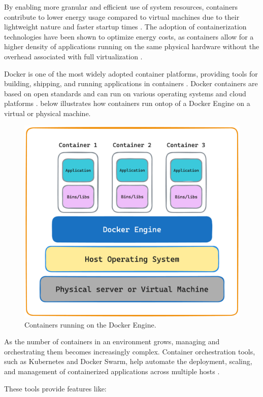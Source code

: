 \documentclass[
  table]{report}
\begin{document}
By enabling more granular and efficient use of system resources,
containers contribute to lower energy usage compared to virtual machines
due to their lightweight nature and faster startup times
\citep{shirinbabPerformanceEvaluationContainers2020}. The adoption of
containerization technologies have been shown to optimize energy costs,
as containers allow for a higher density of applications running on the
same physical hardware without the overhead associated with full
virtualization
\citep{cuadrado-corderoComparativeExperimentalAnalysis2018}.

Docker is one of the most widely adopted container platforms, providing
tools for building, shipping, and running applications in containers
\citep{merkelDockerLightweightLinux2014}. Docker containers are based on
open standards and can run on various operating systems and cloud
platforms \citep{sergeevDockerContainerPerformance2022}.
 below illustrates how containers run ontop of a
Docker Engine on a virtual or physical machine.

\begin{figure}[H]
\centering
  \includegraphics[width=0.7\columnwidth]{assets/3.3-container-figure.png}
  \caption{Containers running on the Docker Engine.}
  \label{container-figure}
\end{figure}

As the number of containers in an environment grows, managing and
orchestrating them becomes increasingly complex. Container orchestration
tools, such as Kubernetes and Docker Swarm, help automate the
deployment, scaling, and management of containerized applications across
multiple hosts \citep{burnsBorgOmegaKubernetes2016}.

These tools provide features like:
\end{document}
